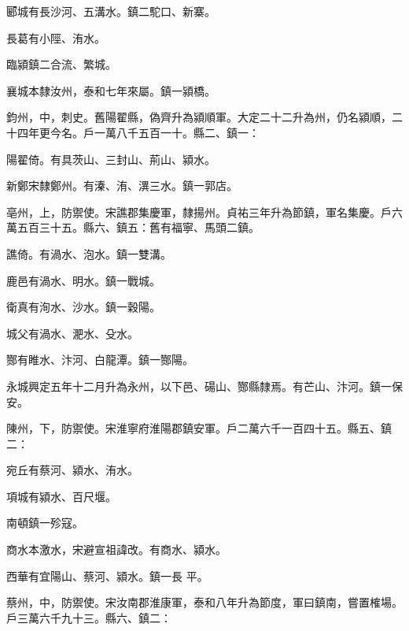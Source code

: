 \begin{pinyinscope}
 郾城有長沙河、五溝水。鎮二駝口、新寨。



 長葛有小陘、洧水。



 臨潁鎮二合流、繁城。



 襄城本隸汝州，泰和七年來屬。鎮一潁橋。



 鈞州，中，刺史。舊陽翟縣，偽齊升為潁順軍。大定二十二升為州，仍名潁順，二十四年更今名。戶一萬八千五百一十。縣二、鎮一：



 陽翟倚。有具茨山、三封山、荊山、潁水。



 新鄭宋隸鄭州。有溱、洧、潩三水。鎮一郭店。



 亳州，上，防禦使。宋譙郡集慶軍，隸揚州。貞祐三年升為節鎮，軍名集慶。戶六萬五百三十五。縣六、鎮五：舊有福寧、馬頭二鎮。



 譙倚。有渦水、泡水。鎮一雙溝。



 鹿邑有渦水、明水。鎮一戰城。



 衛真有洵水、沙水。鎮一穀陽。



 城父有渦水、淝水、殳水。



 酂有睢水、汴河、白龍潭。鎮一酂陽。



 永城興定五年十二月升為永州，以下邑、碭山、酂縣隸焉。有芒山、汴河。鎮一保安。



 陳州，下，防禦使。宋淮寧府淮陽郡鎮安軍。戶二萬六千一百四十五。縣五、鎮二：



 宛丘有蔡河、潁水、洧水。



 項城有潁水、百尺堰。



 南頓鎮一殄寇。



 商水本激水，宋避宣祖諱改。有商水、潁水。



 西華有宜陽山、蔡河、潁水。鎮一長
 平。



 蔡州，中，防禦使。宋汝南郡淮康軍，泰和八年升為節度，軍曰鎮南，嘗置榷場。戶三萬六千九十三。縣六、鎮二：




\end{pinyinscope}
